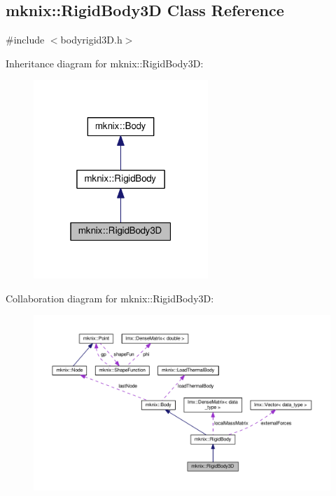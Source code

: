 \hypertarget{classmknix_1_1_rigid_body3_d}{}\subsection{mknix\+:\+:Rigid\+Body3\+D Class Reference}
\label{classmknix_1_1_rigid_body3_d}


{\ttfamily \#include $<$bodyrigid3\+D.\+h$>$}



Inheritance diagram for mknix\+:\+:Rigid\+Body3\+D\+:\nopagebreak
\begin{figure}[H]
\begin{center}
\leavevmode
\includegraphics[width=187pt]{d5/de1/classmknix_1_1_rigid_body3_d__inherit__graph}
\end{center}
\end{figure}


Collaboration diagram for mknix\+:\+:Rigid\+Body3\+D\+:\nopagebreak
\begin{figure}[H]
\begin{center}
\leavevmode
\includegraphics[width=350pt]{d0/ddd/classmknix_1_1_rigid_body3_d__coll__graph}
\end{center}
\end{figure}

